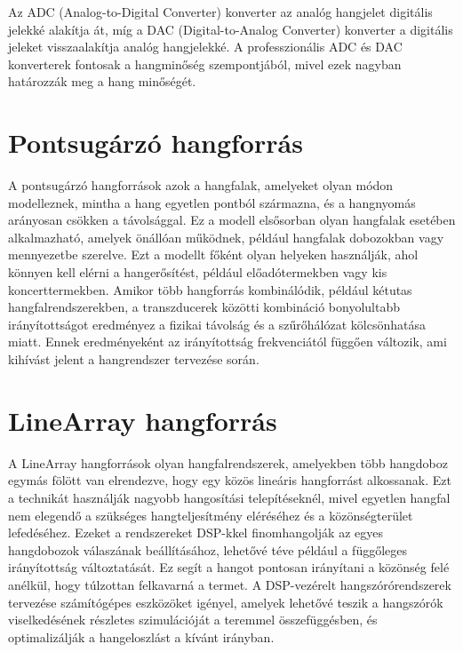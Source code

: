 Az ADC (Analog-to-Digital Converter) konverter az analóg hangjelet digitális jelekké alakítja át, míg a DAC (Digital-to-Analog Converter) 
konverter a digitális jeleket visszaalakítja analóg hangjelekké. 
A professzionális ADC és DAC konverterek fontosak a hangminőség szempontjából, mivel ezek nagyban határozzák meg a hang minőségét.

\section{Pontsugárzó hangforrás}


A pontsugárzó hangforrások azok a hangfalak, amelyeket olyan módon modelleznek, mintha a hang egyetlen pontból származna, és a hangnyomás arányosan csökken a távolsággal. 
Ez a modell elsősorban olyan hangfalak esetében alkalmazható, amelyek önállóan működnek, például hangfalak dobozokban vagy mennyezetbe szerelve. 
Ezt a modellt főként olyan helyeken használják, ahol könnyen kell elérni a hangerősítést, például előadótermekben vagy kis koncerttermekben. 
Amikor több hangforrás kombinálódik, például kétutas hangfalrendszerekben, a transzducerek közötti kombináció bonyolultabb irányítottságot eredményez
a fizikai távolság és a szűrőhálózat kölcsönhatása miatt. 
Ennek eredményeként az irányítottság frekvenciától függően változik, ami kihívást jelent a hangrendszer tervezése során.

\section{LineArray hangforrás}

A LineArray hangforrások olyan hangfalrendszerek, amelyekben több hangdoboz egymás fölött van elrendezve, 
hogy egy közös lineáris hangforrást alkossanak. Ezt a technikát használják nagyobb hangosítási telepítéseknél, 
mivel egyetlen hangfal nem elegendő a szükséges hangteljesítmény eléréséhez és a közönségterület lefedéséhez. 
Ezeket a rendszereket DSP-kkel finomhangolják az egyes hangdobozok válaszának beállításához, lehetővé téve például
a függőleges irányítottság változtatását. Ez segít a hangot pontosan irányítani a közönség felé anélkül, 
hogy túlzottan felkavarná a termet. A DSP-vezérelt hangszórórendszerek tervezése számítógépes eszközöket igényel, 
amelyek lehetővé teszik a hangszórók viselkedésének részletes szimulációját a teremmel összefüggésben, 
és optimalizálják a hangeloszlást a kívánt irányban.


